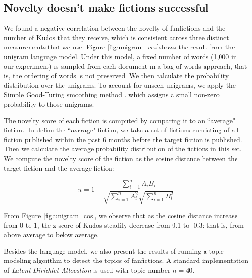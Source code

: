 \documentclass[a4paper]{article}
\begin{document}
\subsection{Novelty doesn't make fictions successful}
We found a negative correlation between the novelty of fanfictions and the number of Kudos that they receive, which is consistent across three distinct measurements that we use.  Figure \ref{fig:unigram_cos}shows the result from the unigram language model. Under this model, a fixed number of words (1,000 in our experiment) is sampled from each document in a bag-of-words approach, that is, the ordering of words is not preserved. We then calculate the probability distribution over the unigrams. To account for unseen unigrams, we apply the Simple Good-Turing smoothing method \cite{gales1995good}, which assigns a small non-zero probability to those unigrams. 

The novelty score of each fiction is computed by comparing it to an ``average" fiction. To define the ``average" fiction, we take a set of fictions consisting of all fiction published within the past 6 months before the target fiction is published. Then we calculate the average probability distribution of the fictions in this set. We compute the novelty score of the fiction as the cosine distance between the target fiction and the average fiction:

\begin{equation}
n = 1-\frac{\sum_{i=1}^{n}{A_iB_i}}{\sqrt{\sum_{i=1}^{n}{A_i^2}}\sqrt{\sum_{i=1}^{n}{B_i^2}}}
\end{equation}

From Figure \ref{fig:unigram_cos}, we observe that as the cosine distance increase from 0 to 1, the z-score of Kudos steadily decrease from 0.1 to -0.3: that is, from above average to below average. 

Besides the language model, we also present the results of running a topic modeling algorithm to detect the topics of fanfictions. A standard implementation of \emph{Latent Dirichlet Allocation}\cite{blei2003latent} is used with topic number $n=40$.
\end{document}
